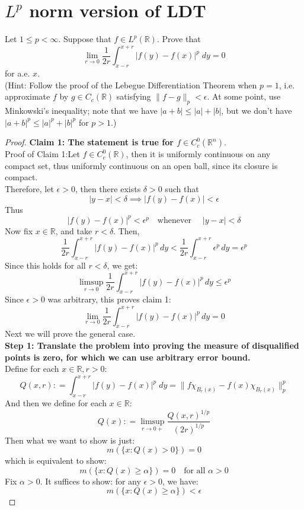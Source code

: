 \documentclass[lang=cn,11pt]{elegantbook}
\begin{document}
\section{$L^p$ norm version of LDT}
  Let $1\le p<\infty$. Suppose that $f\in L^p(\mathbb{R})$. 
  Prove that   \[
    \lim_{r\to 0} \frac1{2r} \int_{x-r}^{x+r} |f(y)-f(x)|^p \;d y=0
  \]
for a.e. $x$. \\
(Hint: Follow the proof of the Lebegue Differentiation Theorem when $p=1$, i.e. approximate $f$ by $g\in C_c(\mathbb{R})$ satisfying $\|f-g\|_p<\epsilon$. At some point, use Minkowski's inequality; note that we have $|a+b|\le |a|+|b|$, but we don't have $|a+b|^p\le |a|^p+|b|^p$ for $p>1$.) 

\begin{proof}
\textbf{  Claim 1: The statement is true for $f \in C_c^0(\mathbb{R}^n)$}.\\
Proof of Claim 1:Let \( f \in C_c^0(\mathbb{R}) \), then it is uniformly continuous on any compact set, thus uniformly continuous on an open ball, since its closure is compact.\\
Therefore, let \( \epsilon > 0 \), then there exists \( \delta > 0 \) such that \[
|y - x| < \delta \implies|f(y) - f(x)| < \epsilon
\]
Thus
\[
|f(y) - f(x)|^p < \epsilon^p \quad \text{whenever } \quad|y - x| < \delta
\]
Now fix \( x \in \mathbb{R} \), and take \( r < \delta \). Then,
\[
\frac{1}{2r} \int_{x - r}^{x + r} |f(y) - f(x)|^p \, dy < \frac{1}{2r} \int_{x - r}^{x + r} \epsilon^p \, dy = \epsilon^p
\]
Since this holds for all \( r < \delta \), we get: \[
\limsup_{r \to 0} \frac{1}{2r} \int_{x - r}^{x + r} |f(y) - f(x)|^p \, dy \le \epsilon^p
\]
Since \( \epsilon > 0 \) was arbitrary, this proves claim 1:
\[
\lim_{r \to 0} \frac{1}{2r} \int_{x - r}^{x + r} |f(y) - f(x)|^p \, dy = 0
\]
Next we will prove the general case.\\
\textbf{Step 1: Translate the problem into proving the measure of disqualified points is zero, for which we can use arbitrary error bound.}\\
Define for each $x\in \mathbb{R}, r>0$:
$$Q(x,r) : =   \int_{x - r}^{x + r} |f(y) - f(x)|^p \; dy = \| f \chi_{B_r(x)}-f(x)\chi_{B_r(x)}\|_{p}^p$$
And then we define for each $x\in \mathbb{R}$:
\[
Q(x) : =  \limsup_{r\to 0+} \frac{Q(x,r)^{1/p}}{(2r)^{1/p}}
\]
Then what we want to show is just: \[ m(\{x: Q(x) > 0\}) = 0\]
which is equivalent to show: \[
m(\{x : Q(x) \geq \alpha \}) = 0 \quad \text{for all } \alpha>0
\]
Fix $\alpha >0$. It suffices to show: for any $\epsilon >0$, we have: \[
m(\{x : Q(x) \geq \alpha \}) < \epsilon
\]
\end{proof}
\end{document}
